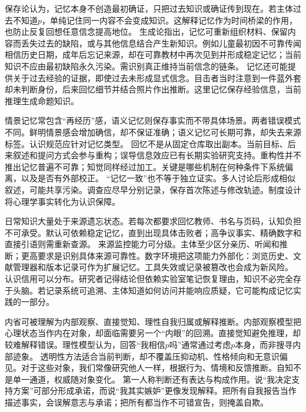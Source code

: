 保存论认为，记忆本身不创造最初确证，只把过去知识或确证传到现在。若主体过去不知道$p$，单纯记住同一内容不会变成知识。这解释记忆作为时间桥梁的作用，也防止反复回想任意信念提高地位。 生成论指出，记忆可重新组织材料、保留内容而丢失过去的缺陷，或与其他信息结合产生新知识\parencite{lackey2005}。例如儿童最初因不可靠传闻相信历史日期，成年后忘记来源，却在可靠教材中再次见到并形成稳定记忆；当前知识不应由最初缺陷永久污染。需识别真正维持当前信念的链条。 记忆还可能提供关于过去经验的证据，即使过去未形成显式信念。目击者当时注意到一件蓝外套却未判断身份，后来回忆细节并结合照片作出推断。这里记忆保存经验信息，当前推理生成命题知识。

情景记忆常包含“再经历”感，语义记忆则保存事实而不带具体场景。两者错误模式不同。鲜明情景感会增加确信，却不保证准确；语义记忆可长期可靠，却失去来源标签。认识规范应针对记忆类型。 回忆不是从固定仓库取出副本。当前目标、后来叙述和提问方式会参与重构；误导信息效应已有长期实验研究支持\parencite{loftus2005}。重构性并不推出记忆普遍不可靠；知觉同样经过加工。关键是哪些机制在何种条件下系统偏离，以及是否有外部校正。 “记忆一致”也不等于独立证实。多人讨论后形成相似叙述，可能共享污染。调查应尽早分别记录，保存首次陈述与修改轨迹。制度设计将心理学事实转化为认识保障。

日常知识大量处于来源遗忘状态。若每次都要求回忆教师、书名与页码，认知负担不可承受。默认可依赖稳定记忆，直到出现具体击败者；高争议事实、精确数字和直接引语则需重新查源。 来源监控能力可分级。主体至少区分亲历、听闻和推断；更高要求是识别具体来源可靠性。数字环境把这项能力外部化：浏览历史、文献管理器和版本记录可作为扩展记忆。工具失效或记录被篡改也会成为新风险。 认识信用可以分布。研究者记得结论但依赖实验室笔记恢复理由，知识不必完全存于头脑。若记录系统可追溯、主体知道如何访问并能响应质疑，它可能构成记忆实践的一部分。

内省可被理解为内部观察、直接觉知、理性自我归属或解释推断。内部观察模型把心理状态当作内在对象，却面临需要另一个“内眼”的回溯。直接觉知避免推理，却较难解释错误。理性模型认为，回答“我相信$p$吗”通常通过考虑$p$本身，而非搜寻内部迹象\parencite{moran2001}。 透明性方法适合当前判断，却不覆盖压抑动机、性格倾向和无意识偏见。对于这些对象，我们常像研究他人一样，根据行为、情境和反馈推断。自知不是单一通道，权威随对象变化。 第一人称判断还有表达与构成作用。说“我决定支持方案”可部分形成承诺，而说“我其实嫉妒”更像发现解释。把所有自我报告当作描述事实，会误解意志与承诺；把所有都当作不可错宣告，则掩盖自欺。

